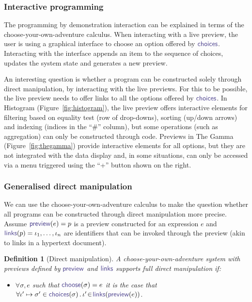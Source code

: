 \documentclass[nonacm,anonymous,sigplan,screen]{acmart}
\newcommand{\ident}[1]{\textsf{\color{DarkSlateBlue}{#1}}}
\newcommand{\select}{\textnormal{\ident{choose}}}
\newcommand{\choices}{\textnormal{\ident{choices}}}
\newcommand{\preview}{\textnormal{\ident{preview}}}
\newcommand{\links}{\textnormal{\ident{links}}}
\newtheorem{definition}{Definition}
\begin{document}
\subsubsection*{Interactive programming}
The programming by demonstration interaction can be explained in terms of the
choose-your-own-adventure calculus. When interacting with a live preview, the user is using a
graphical interface to choose an option offered by $\choices$. Interacting with the interface
appends an item to the sequence of choices, updates the system state
and generates a new preview.

An interesting question is whether a program can be constructed solely through direct manipulation,
by interacting with the live previews. For this to be possible, the live preview needs to
offer links to all the options offered by $\choices$. In Histogram (Figure~\ref{fig:histogram}),
the live preview offers interactive elements for filtering based on equality test (row of
drop-downs), sorting (up/down arrows) and indexing (indices in the ``\#'' column), but some
operations (such as aggregation) can only be constructed through code. Previews in The Gamma
(Figure~\ref{fig:thegamma}) provide interactive elements for all options, but they are
not integrated with the data display and, in some situations, can only be accessed via a
menu triggered using the ``+'' button shown on the right.


\subsubsection*{Generalised direct manipulation}

We can use the choose-your-own-adventure calculus to make the question whether all
programs can be constructed through direct manipulation more precise. Assume
$\preview(e)=p$ is a preview constructed for an expression $e$ and $\links(p)=\iota_1, \ldots, \iota_n$
are identifiers that can be invoked through the preview (akin to links in a hypertext document).

\begin{definition}[Direct manipulation]
A choose-your-own-adventure system with previews defined by $\preview$ and $\links$ supports
full direct manipulation if:
\begin{itemize}
\item $\forall \sigma, e$ such that $\select(\sigma)=e$ it is the case that\\
  $\forall \iota'\mapsto\sigma'\in\choices(\sigma)\,.\,\iota'\!\in\!\links(\preview(e))$.
\end{itemize}
\end{definition}
\end{document}
